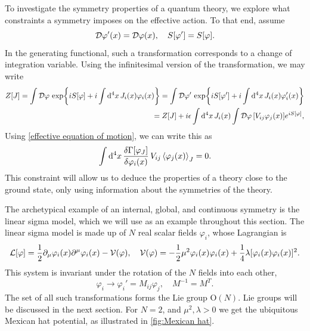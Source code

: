 To investigate the symmetry properties of a quantum theory, we explore what constraints a symmetry imposes on the effective action.
To that end, assume 
\begin{equation}
    \mathcal D \varphi'(x) = \mathcal D \varphi(x), \quad
    S[\varphi'] = S[\varphi].
\end{equation}
%
In the generating functional, such a transformation corresponds to a change of integration variable.
Using the infinitesimal version of the transformation, we may write
\begin{align}
    \nonumber
    Z[J]
    = \int \mathcal D \varphi \, \exp{i S[\varphi] + i \int \dd^4 x \,J_i(x) \varphi_i(x)} 
    = \int \mathcal D \varphi' \, \exp{i S[\varphi'] + i \int \dd^4 x \, J_i(x) \varphi'_i(x)}
    \\
    = Z[J] + i \epsilon \int \dd^4 x \, J_i(x) \int \mathcal D \varphi \, [V_{ij} \varphi_j(x)]  e^{i S[\varphi]},
\end{align}
%
Using \autoref{effective equation of motion}, we can write this as
\begin{equation}
    \label{effective action symmetry requirement}
    \int \dd^4 x \, \fdv{\Gamma[\varphi_J]}{\varphi_i(x)} \, V_{ij}\ex{\varphi_j(x)}_J = 0.
\end{equation}
%
This constraint will allow us to deduce the properties of a theory close to the ground state, only using information about the symmetries of the theory.


The archetypical example of an internal, global, and continuous symmetry is the linear sigma model, which we will use as an example throughout this section.
The linear sigma model is made up of $N$ real scalar fields $\varphi_i$, whose Lagrangian is
\begin{equation}
    \mathcal{L}[\varphi] 
    = \frac{1}{2} \partial_\mu \varphi_i(x) \partial^\mu \varphi_i(x) - \mathcal{V}(\varphi),
    \quad \mathcal{V}(\varphi) = - \frac{1}{2} \mu^2 \varphi_i(x)\varphi_i(x)
    + \frac{1}{4} \lambda [\varphi_i(x) \varphi_i(x)]^2.
\end{equation}
%
This system is invariant under the rotation of the $N$ fields into each other,
\begin{equation}
    \varphi_i \longrightarrow \varphi_i' = M_{ij} \varphi_j,
    \quad M^{-1} = M^{T}.
\end{equation}
%
The set of all such transformations forms the Lie group $\text{O}(N)$.
Lie groups will be discussed in the next section.
For $N = 2$, and $\mu^2, \lambda > 0$ we get the ubiquitous Mexican hat potential, as illustrated in \autoref{fig:Mexican hat}.

